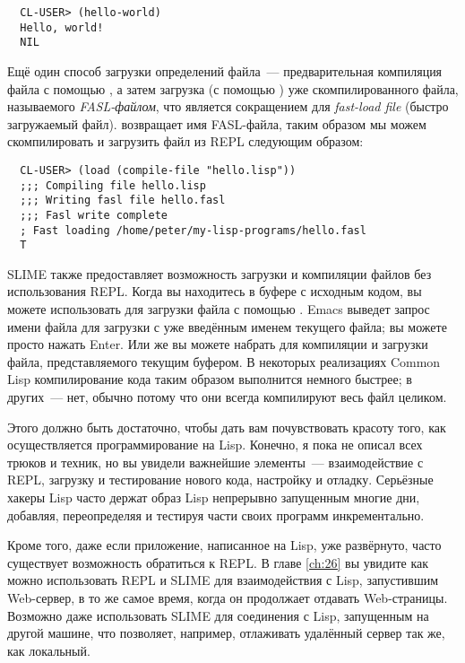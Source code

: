 \begin{verbatim}
  CL-USER> (hello-world)
  Hello, world!
  NIL
\end{verbatim}

Ещё один способ загрузки определений файла~--- предварительная компиляция файла с помощью
, а затем загрузка (с помощью ) уже скомпилированного файла, называемого
\emph{FASL-файлом}, что является сокращением для \emph{fast-load file} (быстро загружаемый
файл).  возвращает имя FASL-файла, таким образом мы можем скомпилировать и
загрузить файл из REPL следующим образом:

\begin{verbatim}
  CL-USER> (load (compile-file "hello.lisp"))
  ;;; Compiling file hello.lisp
  ;;; Writing fasl file hello.fasl
  ;;; Fasl write complete
  ; Fast loading /home/peter/my-lisp-programs/hello.fasl
  T
\end{verbatim}

SLIME также предоставляет возможность загрузки и компиляции файлов без использования
REPL. Когда вы находитесь в буфере с исходным кодом, вы можете использовать  для
загрузки файла с помощью . Emacs выведет запрос имени файла для загрузки с
уже введённым именем текущего файла; вы можете просто нажать Enter. Или же вы можете
набрать  для компиляции и загрузки файла, представляемого текущим буфером. В
некоторых реализациях Common Lisp компилирование кода таким образом выполнится немного
быстрее; в других~--- нет, обычно потому что они всегда компилируют весь файл целиком.

Этого должно быть достаточно, чтобы дать вам почувствовать красоту того, как
осуществляется программирование на Lisp. Конечно, я пока не описал всех трюков и техник,
но вы увидели важнейшие элементы~--- взаимодействие с REPL, загрузку и тестирование нового
кода, настройку и отладку. Серьёзные хакеры Lisp часто держат образ Lisp непрерывно
запущенным многие дни, добавляя, переопределяя и тестируя части своих программ
инкрементально.

Кроме того, даже если приложение, написанное на Lisp, уже развёрнуто, часто существует
возможность обратиться к REPL. В главе \ref{ch:26} вы увидите как можно использовать REPL и SLIME
для взаимодействия с Lisp, запустившим Web-сервер, в то же самое время, когда он
продолжает отдавать Web-страницы. Возможно даже использовать SLIME для соединения с Lisp,
запущенным на другой машине, что позволяет, например, отлаживать удалённый сервер так же,
как локальный.

